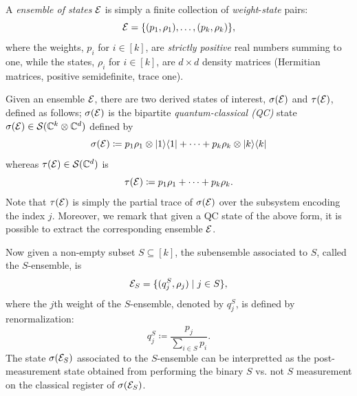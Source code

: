 \documentclass[notitlepage]{article}
\begin{document}
A \textit{ensemble of states} $\mathcal E$ is simply a finite collection of \textit{weight}-\textit{state} pairs:
\begin{equation}
    \mathcal E = \{ (p_1, \rho_1), \ldots, (p_k, \rho_k) \},
\end{equation}
where the weights, $p_i$ for $i \in [k]$, are \textit{strictly positive} real numbers summing to one, while the states, $\rho_i$ for $i \in [k]$, are $d\times d$ density matrices (Hermitian matrices, positive semidefinite, trace one).

Given an ensemble $\mathcal E$, there are two derived states of interest, $\sigma(\mathcal E)$ and $\tau(\mathcal E)$, defined as follows;
$\sigma(\mathcal E)$ is the bipartite \textit{quantum-classical (QC)} state $\sigma(\mathcal E) \in \mathcal S(\mathbb C^{k}\otimes \mathbb C^{d})$ defined by
\begin{equation}
    \sigma(\mathcal E) \coloneqq p_1 \rho_1 \otimes \ket{1}\!\bra{1} + \cdots + p_k \rho_k \otimes \ket{k}\!\bra{k}
\end{equation}
whereas $\tau(\mathcal E) \in \mathcal S(\mathbb C^{d})$ is 
\begin{equation}
    \tau(\mathcal E) \coloneqq p_1 \rho_1 + \cdots + p_k \rho_k.
\end{equation}
Note that $\tau(\mathcal E)$ is simply the partial trace of $\sigma(\mathcal E)$ over the subsystem encoding the index $j$.
Moreover, we remark that given a QC state of the above form, it is possible to extract the corresponding ensemble $\mathcal E$.

Now given a non-empty subset $S \subseteq [k]$, the subensemble associated to $S$, called the $S$-ensemble, is
\begin{equation}
    \mathcal E_{S} = \{ (q^{S}_j, \rho_j) \mid j \in S \},
\end{equation}
where the $j$th weight of the $S$-ensemble, denoted by $q^{S}_j$, is defined by renormalization:
\begin{equation}
    q^{S}_j \coloneqq \frac{p_j}{\sum_{i \in S} p_i}.
\end{equation}
The state $\sigma(\mathcal E_S)$ associated to the $S$-ensemble can be interpretted as the post-measurement state obtained from performing the binary $S$ vs. not $S$ measurement on the classical register of $\sigma(\mathcal E_S)$.
\end{document}
